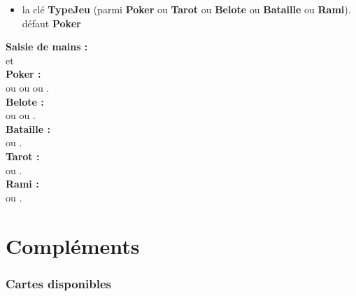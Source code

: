 \documentclass{article}
\newcommand\Cle[1]{{\bfseries\sffamily\textlangle #1\textrangle}}
\begin{document}
{{{{{{{{{\begin{codecles}
\begin{itemize}
	\item la clé \Cle{TypeJeu} (parmi \Cle{Poker} ou \Cle{Tarot} ou \Cle{Belote} ou \Cle{Bataille} ou \Cle{Rami}). \hfill{}défaut \Cle{Poker}
\end{itemize}
\end{codecles}

\begin{codetex}[]
\textbf{\large Saisie de mains : }\\
 et~
\\

\textbf{\large Poker : }\\
 ou  ou  ou .\\

\textbf{\large Belote :}\\
 ou  ou .\\

\textbf{\large Bataille : }\\
 ou .\\

\textbf{\large Tarot : }\\
 ou .\\

\textbf{\large Rami : }\\
 ou .
\end{codetex}

\pagebreak

\part{Compléments}

\section{Cartes disponibles}

}}}}}}}}}
\end{document}
